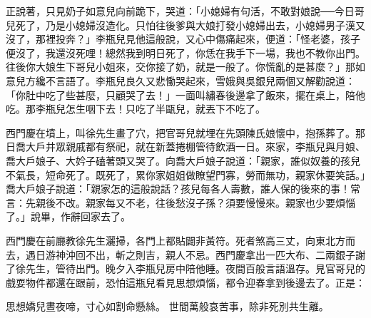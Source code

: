 正說著，只見奶子如意兒向前跪下，哭道：「小媳婦有句活，不敢對娘說──今日哥兒死了，乃是小媳婦沒造化。只怕往後爹與大娘打發小媳婦出去，小媳婦男子漢又沒了，那裡投奔？」李瓶兒見他這般說，又心中傷痛起來，便道：「怪老婆，孩子便沒了，我還沒死哩！總然我到明日死了，你恁在我手下一場，我也不教你出門。往後你大娘生下哥兒小姐來，交你接了奶，就是一般了。你慌亂的是甚麼？」那如意兒方纔不言語了。李瓶兒良久又悲慟哭起來，雪娥與吳銀兒兩個又解勸說道：「你肚中吃了些甚麼，只顧哭了去！」一面叫繡春後邊拿了飯來，擺在桌上，陪他吃。那李瓶兒怎生咽下去！只吃了半甌兒，就丟下不吃了。

西門慶在墳上，叫徐先生畫了穴，把官哥兒就埋在先頭陳氏娘懷中，抱孫葬了。那日喬大戶井眾親戚都有祭祀，就在新蓋捲棚管待飲酒一日。來家，李瓶兒與月娘、喬大戶娘子、大妗子磕著頭又哭了。向喬大戶娘子說道：「親家，誰似奴養的孩兒不氣長，短命死了。既死了，累你家姐姐做瞭望門寡，勞而無功，親家休要笑話。」喬大戶娘子說道：「親家怎的這般說話？孩兒每各人壽數，誰人保的後來的事！常言：先親後不改。親家每又不老，往後愁沒子孫？須要慢慢來。親家也少要煩惱了。」說畢，作辭回家去了。

西門慶在前廳教徐先生灑掃，各門上都貼闢非黃符。死者煞高三丈，向東北方而去，遇日游神沖回不出，斬之則吉，親人不忌。西門慶拿出一匹大布、二兩銀子謝了徐先生，管待出門。晚夕入李瓶兒房中陪他睡。夜間百般言語溫存。見官哥兒的戲耍物件都還在跟前，恐怕這瓶兒看見思想煩惱，都令迎春拿到後邊去了。正是：

思想嬌兒晝夜啼，寸心如割命懸絲。
世間萬般哀苦事，除非死別共生離。
